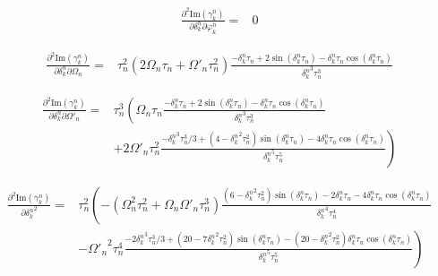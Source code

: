 \documentclass[10pt,fleqn]{article}
\newcommand{\eqar}[1]
{
  \begin{align*}
    #1
  \end{align*}
}
\newcommand{\paren}[1]{{\left({#1}\right)}}
\newcommand{\lparen}[1]{{\left({#1}\right.}}
\newcommand{\rparen}[1]{{\left.{#1}\right)}}
\begin{document}
\eqar{
  \frac{\partial^2\mathrm{Im}\paren{\gamma_k^n}}{\partial\delta_k^n\partial\varphi_k^n}=&0
}
\eqar{
  \frac{\partial^2\mathrm{Im}\paren{\gamma_k^n}}{\partial\delta_k^n\partial\Omega_n}=&\tau_n^2\paren{2\Omega_n\tau_n+\Omega'_n\tau_n^2}
  \frac{-\delta_k^n\tau_n+2\sin\paren{{\delta_k^n}\tau_n}-{\delta_k^n}\tau_n\cos\paren{{\delta_k^n}\tau_n}}{{\delta_k^n}^3\tau_n^3}
}
\eqar{
  \frac{\partial^2\mathrm{Im}\paren{\gamma_k^n}}{\partial\delta_k^n\partial\Omega'_n}=&\tau_n^3\lparen{
    \Omega_n\tau_n
    \frac{-\delta_k^n\tau_n+2\sin\paren{{\delta_k^n}\tau_n}-{\delta_k^n}\tau_n\cos\paren{{\delta_k^n}\tau_n}}{{\delta_k^n}^3\tau_n^3}
  }\\
  &\rparen{+2\Omega'_n\tau_n^2\frac{
      -{\delta_k^n}^3\tau_n^3/3
      +\paren{4-{\delta_k^n}^2\tau_n^2}\sin\paren{{\delta_k^n}\tau_n}
      -4{\delta_k^n}\tau_n\cos\paren{{\delta_k^n}\tau_n}
    }{{\delta_k^n}^5\tau_n^5}
  }
}
\eqar{
  \frac{\partial^2\mathrm{Im}\paren{\gamma_k^n}}{{\partial\delta_k^n}^2}=&\tau_n^2\lparen{
    -\paren{\Omega_n^2\tau_n^2+\Omega_n\Omega'_n\tau_n^3}
    \frac{
      \paren{6-{\delta_k^n}^2\tau_n^2}\sin\paren{{\delta_k^n}\tau_n}
      -2{\delta_k^n}\tau_n-4{\delta_k^n}\tau_n\cos\paren{{\delta_k^n}\tau_n}
    }{{\delta_k^n}^4\tau_n^4}
  }\\
  &\rparen{-{\Omega'_n}^2\tau_n^4
    \frac{
      -2{\delta_k^n}^3\tau_n^3/3
      +\paren{20-7{\delta_k^n}^2\tau_n^2}\sin\paren{{\delta_k^n}\tau_n}
      -\paren{20-{\delta_k^n}^2\tau_n^2}{\delta_k^n}\tau_n\cos\paren{{\delta_k^n}\tau_n}
    }{{\delta_k^n}^5\tau_n^5}
  }
}
\end{document}
